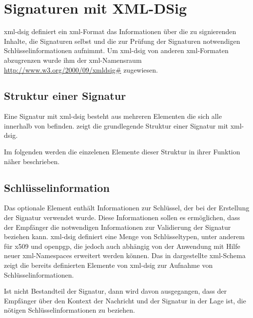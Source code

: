 
\chapter{Signaturen mit XML-DSig}
\label{chap:SignaturenXMLDSig}
\gls{xml-dsig} definiert ein \gls{xml}-Format das Informationen über die zu signierenden Inhalte, die Signaturen selbst und die zur Prüfung der Signaturen
notwendigen Schlüsselinformationen aufnimmt. Um \gls{xml-dsig} von anderen \gls{xml}-Formaten abzugrenzen wurde ihm der \gls{xml}-Namensraum
\url{http://www.w3.org/2000/09/xmldsig#} zugewiesen. 


\section{Struktur einer Signatur}
Eine Signatur mit \gls{xml-dsig} besteht aus mehreren Elementen die sich alle innerhalb von  befinden.  zeigt
die grundlegende Struktur einer Signatur mit \gls{xml-dsig}.



Im folgenden werden die einzelenen Elemente dieser Struktur in ihrer Funktion näher beschrieben. 

\section{Schlüsselinformation}
Das optionale Element  enthält Informationen zur Schlüssel, der bei der Erstellung der Signatur verwendet wurde. Diese Informationen sollen es
ermöglichen, dass der Empfänger die notwendigen Informationen zur Validierung der Signatur beziehen kann. \gls{xml-dsig} definiert eine Menge von
Schlüsseltypen, unter anderem für \gls{x509} und \gls{openpgp}, die jedoch auch abhängig von der Anwendung mit Hilfe neuer \gls{xml}-Namespaces erweitert werden
können. Das in  dargestellte \gls{xml}-Schema zeigt die bereits definierten Elemente von \gls{xml-dsig} zur Aufnahme von
Schlüsselinformationen.



Ist  nicht Bestandteil der Signatur, dann wird davon ausgegangen, dass der Empfänger über den Kontext der Nachricht und der Signatur in der
Lage ist, die nötigen Schlüsselinformationen zu beziehen.

